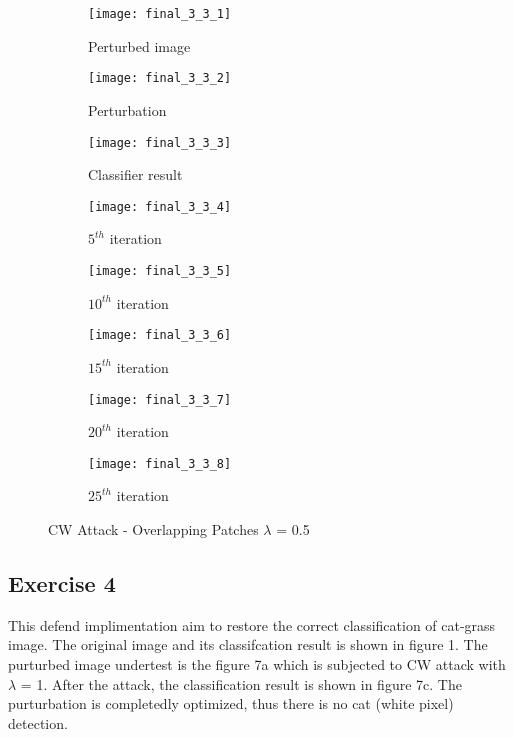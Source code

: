 \documentclass[11pt]{article}
\begin{document}
\begin{figure}[H]
\begin{subfigure}{.22\textwidth}
  \centering
  \texttt{[image: final\_3\_3\_1]}
  \caption{Perturbed image}
  \label{fig:}
\end{subfigure}
\begin{subfigure}{.22\textwidth}
  \centering
  \texttt{[image: final\_3\_3\_2]}
  \caption{Perturbation}
  \label{fig:}
\end{subfigure}
\begin{subfigure}{.22\textwidth}
  \centering
  \texttt{[image: final\_3\_3\_3]}
  \caption{Classifier result}
  \label{fig:}
\end{subfigure}
\begin{subfigure}{.22\textwidth}
  \centering
  \texttt{[image: final\_3\_3\_4]}
  \caption{$5^{th}$ iteration}
  \label{fig:}
\end{subfigure}

\begin{subfigure}{.22\textwidth}
  \centering
  \texttt{[image: final\_3\_3\_5]}
  \caption{$10^{th}$ iteration}
  \label{fig:}
\end{subfigure}
\begin{subfigure}{.22\textwidth}
  \centering
  \texttt{[image: final\_3\_3\_6]}
  \caption{$15^{th}$ iteration}
  \label{fig:}
\end{subfigure}
\begin{subfigure}{.22\textwidth}
  \centering
  \texttt{[image: final\_3\_3\_7]}
  \caption{$20^{th}$ iteration}
  \label{fig:}
\end{subfigure}
\begin{subfigure}{.22\textwidth}
  \centering
  \texttt{[image: final\_3\_3\_8]}
  \caption{$25^{th}$ iteration}
  \label{fig:}
\end{subfigure}

\caption{CW Attack - Overlapping Patches $\lambda$ = 0.5}
\label{fig:}
\end{figure}

\subsection*{Exercise 4}


This defend implimentation aim to restore the correct classification of cat-grass image. The original image and its classifcation result is shown in figure 1. The purturbed image undertest is the figure 7a which is subjected to CW attack with $\lambda$ = 1. After the attack, the classification result is shown in figure 7c. The purturbation is completedly optimized, thus there is no cat (white pixel) detection. 
\end{document}
